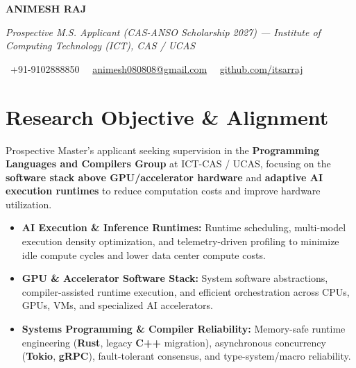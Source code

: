 \documentclass[a4paper,11pt]{article}
\newcommand{\socialicon}[1]{\raisebox{-0.05em}{\resizebox{!}{1em}{#1}}}
\newcommand{\headerfontiii}{\fontfamily{ppl}\selectfont} %
\begin{document}
\headerfontiii

\begin{center}
    {\Huge\textbf{ANIMESH RAJ}}
\end{center}
\vspace{-6mm}

\begin{center}
    {\small\textit{Prospective M.S. Applicant (CAS-ANSO Scholarship 2027) --- Institute of Computing Technology (ICT), CAS / UCAS}}
\end{center}
\vspace{-6mm}

\begin{center}
    {\small
    \socialicon{\faPhone}\ +91-9102888850 \textbar\ 
    \socialicon{\faEnvelope}\ \href{mailto:animesh080808@gmail.com}{animesh080808@gmail.com} \textbar\ 
    \socialicon{\faGithub}\ \href{https://github.com/itsarraj}{github.com/itsarraj}
    }
\end{center}
\vspace{-4mm}

\section{\textbf{Research Objective \& Alignment}}
\vspace{1mm}
{\small
Prospective Master's applicant seeking supervision in the \textbf{Programming Languages and Compilers Group} at ICT-CAS / UCAS, focusing on the \textbf{software stack above GPU/accelerator hardware} and \textbf{adaptive AI execution runtimes} to reduce computation costs and improve hardware utilization.
\begin{itemize}[leftmargin=3ex, itemsep=0.4mm, topsep=1mm]
    \item \textbf{AI Execution \& Inference Runtimes:} Runtime scheduling, multi-model execution density optimization, and telemetry-driven profiling to minimize idle compute cycles and lower data center compute costs.
    \item \textbf{GPU \& Accelerator Software Stack:} System software abstractions, compiler-assisted runtime execution, and efficient orchestration across CPUs, GPUs, VMs, and specialized AI accelerators.
    \item \textbf{Systems Programming \& Compiler Reliability:} Memory-safe runtime engineering (\textbf{Rust}, legacy \textbf{C++} migration), asynchronous concurrency (\textbf{Tokio}, \textbf{gRPC}), fault-tolerant consensus, and type-system/macro reliability.
\end{itemize}
}
\vspace{-3mm}
\end{document}
